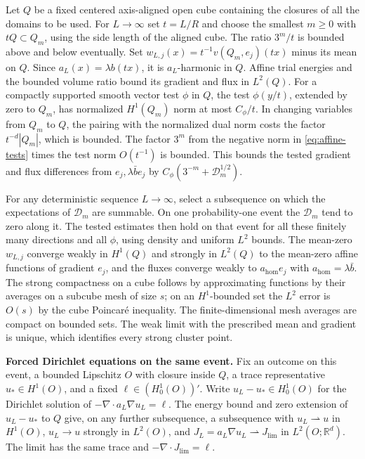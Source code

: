 \documentclass[11pt]{article}
\begin{document}
Let \(Q\) be a fixed centered axis-aligned open cube containing the closures of all the domains to be used. For \(L\to\infty\) set \(t=L/R\) and choose the smallest \(m\ge0\) with \(tQ\subset Q_m\), using the side length of the aligned cube. The ratio \(3^m/t\) is bounded above and below eventually. Set \(w_{L,j}(x)=t^{-1}v(Q_m,e_j)(tx)\) minus its mean on \(Q\). Since \(a_L(x)=\lambda b(tx)\), it is \(a_L\)-harmonic in \(Q\). Affine trial energies and the bounded volume ratio bound its gradient and flux in \(L^2(Q)\). For a compactly supported smooth vector test \(\phi\) in \(Q\), the test \(\phi(y/t)\), extended by zero to \(Q_m\), has normalized \(H^1(Q_m)\) norm at most \(C_\phi/t\). In changing variables from \(Q_m\) to \(Q\), the pairing with the normalized dual norm costs the factor \(t^{-d}|Q_m|\), which is bounded. The factor \(3^m\) from the negative norm in \eqref{eq:affine-tests} times the test norm \(O(t^{-1})\) is bounded. This bounds the tested gradient and flux differences from \(e_j,\lambda\bar b e_j\) by \(C_\phi(3^{-m}+\mathcal D_m^{1/2})\).

For any deterministic sequence \(L\to\infty\), select a subsequence on which the expectations of \(\mathcal D_m\) are summable. On one probability-one event the \(\mathcal D_m\) tend to zero along it. The tested estimates then hold on that event for all these finitely many directions and all \(\phi\), using density and uniform \(L^2\) bounds. The mean-zero \(w_{L,j}\) converge weakly in \(H^1(Q)\) and strongly in \(L^2(Q)\) to the mean-zero affine functions of gradient \(e_j\), and the fluxes converge weakly to \(a_{\mathrm{hom}}e_j\) with \(a_{\mathrm{hom}}=\lambda\bar b\). The strong compactness on a cube follows by approximating functions by their averages on a subcube mesh of size \(s\); on an \(H^1\)-bounded set the \(L^2\) error is \(O(s)\) by the cube Poincaré inequality. The finite-dimensional mesh averages are compact on bounded sets. The weak limit with the prescribed mean and gradient is unique, which identifies every strong cluster point.

\textbf{Forced Dirichlet equations on the same event.} Fix an outcome on this event, a bounded Lipschitz \(O\) with closure inside \(Q\), a trace representative \(u_*\in H^1(O)\), and a fixed \(\ell\in (H_0^1(O))'\). Write \(u_L-u_*\in H_0^1(O)\) for the Dirichlet solution of \(-\nabla\cdot a_L\nabla u_L=\ell\). The energy bound and zero extension of \(u_L-u_*\) to \(Q\) give, on any further subsequence, a subsequence with \(u_L\rightharpoonup u\) in \(H^1(O)\), \(u_L\to u\) strongly in \(L^2(O)\), and \(J_L=a_L\nabla u_L\rightharpoonup J_{\mathrm{lim}}\) in \(L^2(O;\mathbb R^d)\). The limit has the same trace and \(-\nabla\cdot J_{\mathrm{lim}}=\ell\).
\end{document}
